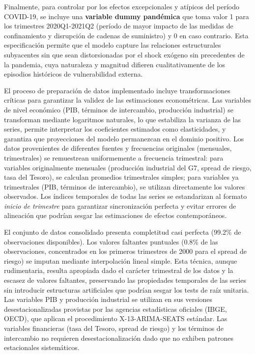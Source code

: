 \documentclass[3p,11pt,draft,natbib=false]{elsarticle}
\begin{document}
Finalmente, para controlar por los efectos excepcionales y atípicos del período COVID-19, se incluye una \textbf{variable dummy pandémica} que toma valor 1 para los trimestres 2020Q1-2021Q2 (período de mayor impacto de las medidas de confinamiento y disrupción de cadenas de suministro) y 0 en caso contrario. Esta especificación permite que el modelo capture las relaciones estructurales subyacentes sin que sean distorsionadas por el shock exógeno sin precedentes de la pandemia, cuya naturaleza y magnitud difieren cualitativamente de los episodios históricos de vulnerabilidad externa.

El proceso de preparación de datos implementado incluye transformaciones críticas para garantizar la validez de las estimaciones econométricas. Las variables de nivel económico (PIB, términos de intercambio, producción industrial) se transforman mediante logaritmos naturales, lo que estabiliza la varianza de las series, permite interpretar los coeficientes estimados como elasticidades, y garantiza que proyecciones del modelo permanezcan en el dominio positivo. Los datos provenientes de diferentes fuentes y frecuencias originales (mensuales, trimestrales) se remuestrean uniformemente a frecuencia trimestral: para variables originalmente mensuales (producción industrial del G7, spread de riesgo, tasa del Tesoro), se calculan promedios trimestrales simples; para variables ya trimestrales (PIB, términos de intercambio), se utilizan directamente los valores observados. Los índices temporales de todas las series se estandarizan al formato \textit{inicio de trimestre} para garantizar sincronización perfecta y evitar errores de alineación que podrían sesgar las estimaciones de efectos contemporáneos.

El conjunto de datos consolidado presenta completitud casi perfecta (99.2\% de observaciones disponibles). Los valores faltantes puntuales (0.8\% de las observaciones, concentrados en los primeros trimestres de 2000 para el spread de riesgo) se imputan mediante interpolación lineal simple. Esta técnica, aunque rudimentaria, resulta apropiada dado el carácter trimestral de los datos y la escasez de valores faltantes, preservando las propiedades temporales de las series sin introducir estructuras artificiales que podrían sesgar los tests de raíz unitaria. Las variables PIB y producción industrial se utilizan en sus versiones desestacionalizadas provistas por las agencias estadísticas oficiales (IBGE, OECD), que aplican el procedimiento X-13-ARIMA-SEATS estándar. Las variables financieras (tasa del Tesoro, spread de riesgo) y los términos de intercambio no requieren desestacionalización dado que no exhiben patrones estacionales sistemáticos.
\end{document}
